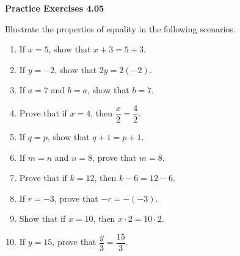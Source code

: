 \vspace{0.3ex}
\noindent\textbf{Practice Exercises 4.05}

\vspace{0.2ex}

Illustrate the properties of equality in the following scenarios.

\begin{enumerate}
    \item If \(x = 5\), show that \(x + 3 = 5 + 3\).  
    \item If \(y = -2\), show that \(2y = 2(-2)\).  
    \item If \(a = 7\) and \(b = a\), show that \(b = 7\).  
    \item Prove that if \(x = 4\), then \(\dfrac{x}{2} = \dfrac{4}{2}\).  
    \item If \(q = p\), show that \(q + 1 = p + 1\).  
    \item If \(m = n\) and \(n = 8\), prove that \(m = 8\).  
    \item Prove that if \(k = 12\), then \(k - 6 = 12 - 6\).  
    \item If \(r = -3\), prove that \(-r = -(-3)\).  
    \item Show that if \(x = 10\), then \(x \cdot 2 = 10 \cdot 2\).  
    \item If \(y = 15\), prove that \(\dfrac{y}{3} = \dfrac{15}{3}\).  
\end{enumerate}
